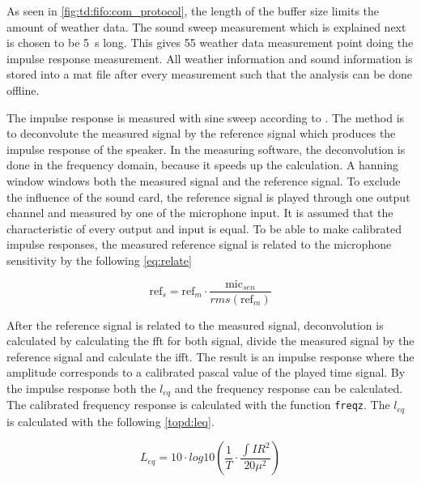 As seen in \autoref{fig:td:fifo:com_protocol}, the length of the buffer size limits the amount of weather data. The sound sweep measurement which is explained next is chosen to be \SI{5}{\second} long. This gives 55 weather data measurement point doing the impulse response measurement. All weather information and sound information is stored into a mat file after every measurement such that the analysis can be done offline.

The impulse response is measured with sine sweep according to \citep{mller2001transfer}. The method is to deconvolute the measured signal by the reference signal which produces the impulse response of the speaker. In the measuring software, the deconvolution is done in the frequency domain, because it speeds up the calculation. A hanning window windows both the measured signal and the reference signal. To exclude the influence of the sound card, the reference signal is played through one output channel and measured by one of the microphone input. It is assumed that the characteristic of every output and input is equal. To be able to make calibrated impulse responses, the measured reference signal is related to the microphone sensitivity by the following \autoref{eq:relate}

\begin{equation}\label{eq:relate}
\text{ref}_{s} = \text{ref}_{m} \cdot    \frac{\text{mic}_{sen}}{rms(\text{ref}_{m})}
\end{equation}

\startexplain
{}
\stopexplain

After the reference signal is related to the measured signal, deconvolution is calculated by calculating the \gls{fft} for both signal, divide the measured signal by the reference signal and calculate the \gls{ifft}. The result is an impulse response where the amplitude corresponds to a calibrated pascal value of the played time signal. By the impulse response both the $l_{eq}$ and the frequency response can be calculated. The calibrated frequency response is calculated with the \matlab function \texttt{freqz}. The $l_{eq}$ is calculated with the following \autoref{topd:leq}.


\begin{equation}\label{topd:leq}
L_{eq} = 10 \cdot log10 \left ( \frac{1}{T} \cdot \frac{\int IR^2}{20\mu^2 } \right )
\end{equation}

